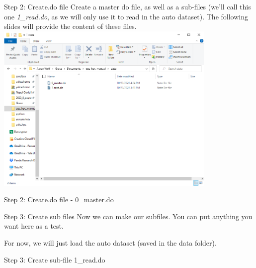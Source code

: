 \documentclass[10pt,xcolor={svgnames}]{beamer}
\begin{document}
\begin{frame}{Step 2: Create.do file}
\center
Create a master do file, as well as a sub-files (we'll call this one \textit{1\_read.do}, as we will only use it to read in the auto dataset). The following slides will provide the content of these files.
\includegraphics[width=0.8\textwidth]{screenshots/fig9b.PNG} 
\end{frame}


\begin{frame}[fragile]{Step 2: Create.do file - 0\_master.do}
\center
{}
\end{frame}


\begin{frame}{Step 3: Create sub files}
Now we can make our subfiles. You can put anything you want here as a test. 

For now, we will just load the auto dataset (saved in the data folder).
\end{frame}

\begin{frame}[fragile]{Step 3: Create sub-file 1\_read.do}
\center
{}
\end{frame}
\end{document}
